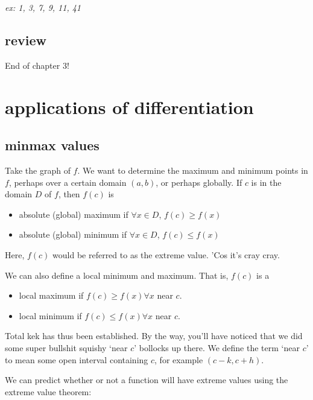 \documentclass[10pt,a4paper]{report}
\begin{document}
\emph{ex: 1, 3, 7, 9, 11, 41}

\section*{review}

End of chapter 3!
















\chapter{applications of differentiation}

\section{minmax values}

Take the graph of $f$. We want to determine the maximum and minimum points in $f$, perhaps over a certain domain $(a, b)$, or perhaps globally. If $c$ is in the domain $D$ of $f$, then $f(c)$ is

\begin{itemize}
	\item absolute (global) maximum if $\forall x \in D$, $f(c) \geq f(x)$
	\item absolute (global) minimum if $\forall x \in D$, $f(c) \leq f(x)$
\end{itemize}

Here, $f(c)$ would be referred to as the extreme value. 'Cos it's cray cray.

We can also define a local minimum and maximum. That is, $f(c)$ is a

\begin{itemize}
	\item local maximum if $f(c) \geq f(x) \forall x$ near $c$.
	\item local minimum if $f(c) \leq f(x) \forall x$ near $c$.
\end{itemize}

Total kek has thus been established. By the way, you'll have noticed that we did some super bullshit squishy `near $c$' bollocks up there. We define the term `near $c$' to mean some open interval containing $c$, for example $(c - k, c + h)$.

We can predict whether or not a function will have extreme values using the extreme value theorem:
\end{document}

